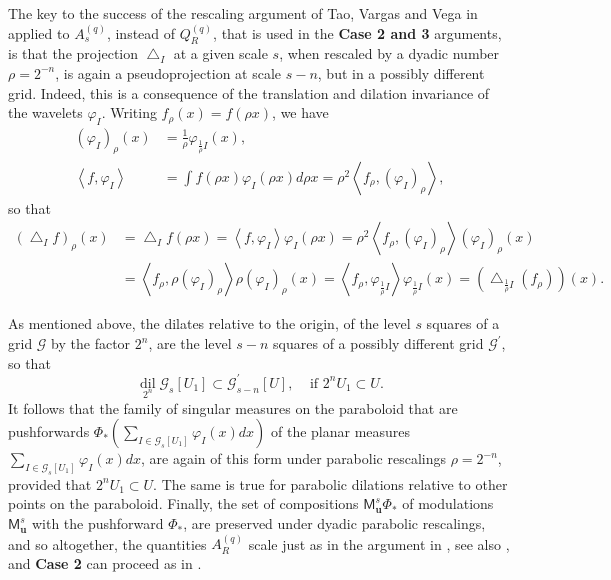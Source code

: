 \documentclass{amsart}%
\theoremstyle{plain}
\numberwithin{equation}{section}
\begin{document}
The key to the success of the rescaling argument of Tao, Vargas and Vega in
\cite{TaVaVe} applied to $A_{s}^{\left(  q\right)  }$, instead of
$Q_{R}^{\left(  q\right)  }$, that is used in the \textbf{Case 2 and 3}
arguments, is that the projection $\bigtriangleup_{I}$ at a given scale $s$,
when rescaled by a dyadic number $\rho=2^{-n}$, is again a pseudoprojection at
scale $s-n$, but in a possibly different grid. Indeed, this is a consequence
of the translation and dilation invariance of the wavelets $\varphi_{I}$.
Writing $f_{\rho}\left(  x\right)  =f\left(  \rho x\right)  $, we have%
\begin{align*}
\left(  \varphi_{I}\right)  _{\rho}\left(  x\right)   &  =\frac{1}{\rho
}\varphi_{\frac{1}{\rho}I}\left(  x\right)  ,\\
\left\langle f,\varphi_{I}\right\rangle  &  =\int f\left(  \rho x\right)
\varphi_{I}\left(  \rho x\right)  d\rho x=\rho^{2}\left\langle f_{\rho
},\left(  \varphi_{I}\right)  _{\rho}\right\rangle ,
\end{align*}
so that%
\begin{align}
\left(  \bigtriangleup_{I}f\right)  _{\rho}\left(  x\right)   &
=\bigtriangleup_{I}f\left(  \rho x\right)  =\left\langle f,\varphi
_{I}\right\rangle \varphi_{I}\left(  \rho x\right)  =\rho^{2}\left\langle
f_{\rho},\left(  \varphi_{I}\right)  _{\rho}\right\rangle \left(  \varphi
_{I}\right)  _{\rho}\left(  x\right) \label{par res}\\
&  =\left\langle f_{\rho},\rho\left(  \varphi_{I}\right)  _{\rho}\right\rangle
\rho\left(  \varphi_{I}\right)  _{\rho}\left(  x\right)  =\left\langle
f_{\rho},\varphi_{\frac{1}{\rho}I}\right\rangle \varphi_{\frac{1}{\rho}%
I}\left(  x\right)  =\left(  \bigtriangleup_{\frac{1}{\rho}I}\left(  f_{\rho
}\right)  \right)  \left(  x\right)  .\nonumber
\end{align}


As mentioned above, the dilates relative to the origin, of the level $s$
squares of a grid $\mathcal{G}$ by the factor $2^{n}$, are the level $s-n$
squares of a possibly different grid $\mathcal{G}^{\prime}$, so that
\[
\operatorname*{dil}_{2^{n}}\mathcal{G}_{s}\left[  U_{1}\right]  \subset
\mathcal{G}_{s-n}^{\prime}\left[  U\right]  ,\ \ \ \ \ \text{if }2^{n}%
U_{1}\subset U.
\]
It follows that the family of singular measures on the paraboloid that are
pushforwards $\Phi_{\ast}\left(  \sum_{I\in\mathcal{G}_{s}\left[
U_{1}\right]  }\varphi_{I}\left(  x\right)  dx\right)  $ of the planar
measures $\sum_{I\in\mathcal{G}_{s}\left[  U_{1}\right]  }\varphi_{I}\left(
x\right)  dx $, are again of this form under parabolic rescalings $\rho
=2^{-n}$, provided that $2^{n}U_{1}\subset U$. The same is true for parabolic
dilations relative to other points on the paraboloid. Finally, the set of
compositions $\mathsf{M}_{\mathbf{u}}^{s}\Phi_{\ast}$ of modulations
$\mathsf{M}_{\mathbf{u}}^{s}$ with the pushforward $\Phi_{\ast}$, are
preserved under dyadic parabolic rescalings, and so altogether, the quantities
$A_{R}^{\left(  q\right)  }$ scale just as in the argument in \cite[Case 2 of
the proof of Theorem 3]{RiSa}, see also \cite[Section 2]{BoGu}, and
\textbf{Case 2} can proceed as in \cite[proof of Theorem 3]{RiSa}.
\end{document}
